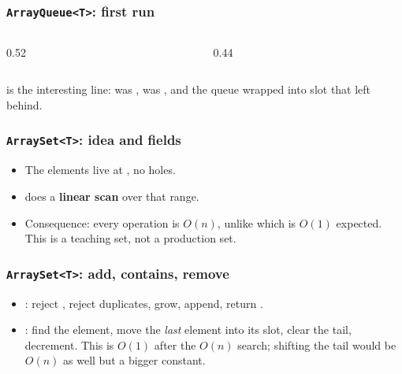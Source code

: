 \documentclass[aspectratio=169,10pt,compress]{beamer}
\begin{document}
\begin{frame}[t,fragile] \frametitle{\texttt{ArrayQueue<T>}: first run}
  \begin{columns}[T]
    \begin{column}{0.52\textwidth}
    \end{column}
    \begin{column}{0.44\textwidth}
    \end{column}
  \end{columns}
  \small
  \hCode{[B, C, D]} is the interesting line:  was ,
   was , and the queue wrapped into slot 
  that  left behind.
\end{frame}





\begin{frame}[t,fragile] \frametitle{\texttt{ArraySet<T>}: idea and fields}
  \begin{itemize}\small
    \item The elements live at , no holes.
    \item {} does a \textbf{linear scan} over that range.
    \item Consequence: every operation is $O(n)$, unlike 
          which is $O(1)$ expected. This is a teaching set, not a
          production set.
  \end{itemize}
\end{frame}




\begin{frame}[t,fragile] \frametitle{\texttt{ArraySet<T>}: add, contains, remove}
  \begin{itemize}\small
    \item {}: reject , reject duplicates, grow, append,
          return .
    \item {}: find the element, move the \emph{last} element
          into its slot, clear the tail, decrement. This is $O(1)$
          after the $O(n)$ search; shifting the tail would be $O(n)$
          as well but a bigger constant.
  \end{itemize}
\end{frame}
\end{document}
